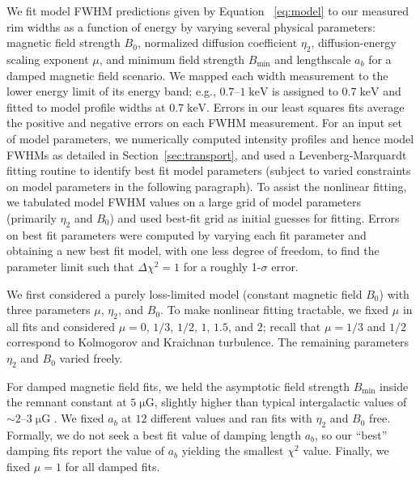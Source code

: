 \documentclass[iop, apj, numberedappendix]{emulateapj}
\newcommand*{\mt}{\mathrm}
\newcommand*{\unit}[1]{\;\mt{#1}}  %
\newcommand*{\abt}{\mathord{\sim}} %
\newcommand*{\muG}{\unit{\mu G}}
\begin{document}
We fit model FWHM predictions given by Equation~ \eqref{eq:model} to our
measured rim widths as a function of energy by varying several physical
parameters: magnetic field strength $B_0$, normalized diffusion coefficient
$\eta_2$, diffusion-energy scaling exponent $\mu$, and minimum field strength
$B_{\mt{min}}$ and lengthscale $a_b$ for a damped magnetic field scenario.  We
mapped each width measurement to the lower energy limit of its energy band;
e.g., $0.7$--$1 \unit{keV}$ is assigned to $0.7 \unit{keV}$ and fitted to model
profile widths at $0.7 \unit{keV}$.  Errors in our least squares fits average
the positive and negative errors on each FWHM measurement.  For an input set of
model parameters, we numerically computed intensity profiles and hence model
FWHMs as detailed in Section~\ref{sec:transport}, and used a
Levenberg-Marquardt fitting routine to identify best fit model parameters
(subject to varied constraints on model parameters in the following paragraph).
To assist the nonlinear fitting, we tabulated model FWHM values on a large grid
of model parameters (primarily $\eta_2$ and $B_0$) and used best-fit grid as
initial guesses for fitting.
Errors on best fit parameters were computed by varying each fit parameter and
obtaining a new best fit model, with one less degree of freedom, to find the
parameter limit such that $\Delta \chi^2 = 1$ for a roughly 1-$\sigma$ error.

We first considered a purely loss-limited model (constant magnetic field
$B_0$) with three parameters $\mu$, $\eta_2$, and $B_0$.  To make nonlinear
fitting tractable, we fixed $\mu$ in all fits and considered $\mu = 0$, $1/3$,
$1/2$, $1$, $1.5$, and $2$; recall that $\mu = 1/3$ and $1/2$ correspond to
Kolmogorov and Kraichnan turbulence.  The remaining parameters $\eta_2$ and
$B_0$ varied freely.

For damped magnetic field fits, we held the asymptotic field strength
$B_{\mt{min}}$ inside the remnant constant at $5 \muG$, slightly higher than
typical intergalactic values of $\abt 2$--$3 \muG$ \citep{lyne1989, han2006}.
We fixed $a_b$ at $12$ different values and ran fits with $\eta_2$ and $B_0$
free.  Formally, we do not seek a best fit value of damping length $a_b$, so
our ``best'' damping fits report the value of $a_b$ yielding the smallest
$\chi^2$ value.  Finally, we fixed $\mu = 1$ for all damped fits.
\end{document}
